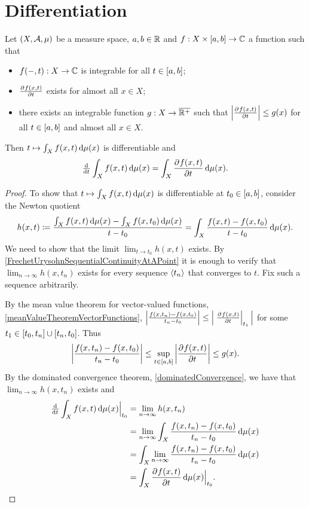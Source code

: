 \section{Differentiation}
\begin{proposition} \label{differentiationUnderIntegral}
Let $\sSet{X,\mathcal{A},\mu}$ be a measure space, $a,b\in \mathbb{R}$ and $f: X\times \interval{a,b}\to \C$ a function such that
\begin{itemize}
\item $f(-,t): X\to \mathbb{C}$ is integrable for all $t\in \interval{a,b}$;
\item $ \frac{\partial{^{}}f(x,t)}{\partial{{t}^{}}} $ exists for almost all $x\in X$;
\item there exists an integrable function $g: X\to \overline{\mathbb{R}^+}$ such that $\left| \frac{\partial{^{}}f(x,t)}{\partial{{t}^{}}} \right| \leq g(x)$ for all $t\in \interval{a,b}$ and almost all $x\in X$.
\end{itemize}
Then $t\mapsto \int_X f(x,t)\operatorname{d \!}{\mu}(x)$ is differentiable and
\[ \od{}{t}\int_X f(x,t)\diff{\mu}(x) = \int_X \pd{f(x,t)}{t}\diff{\mu}(x). \]
\end{proposition}
\begin{proof}
To show that $t\mapsto \int_X f(x,t)\operatorname{d \!}{\mu}(x)$ is differentiable at $t_0\in \interval{a,b}$, consider the Newton quotient
\[ h(x,t) \coloneqq \frac{\int_X f(x,t)\operatorname{d \!}{\mu}(x) - \int_X f(x,t_0)\operatorname{d \!}{\mu}(x)}{t-t_0} = \int_X \frac{f(x,t) - f(x,t_0)}{t-t_0}\operatorname{d \!}{\mu}(x). \]
We need to show that the limit $\lim_{t\to t_0} h(x,t)$ exists. By \ref{FrechetUrysohnSequentialContinuityAtAPoint} it is enough to verify that $\lim_{n\to \infty} h(x,t_n)$ exists for every sequence $\left\langle t_n \right\rangle$ that converges to $t$. Fix such a sequence arbitrarily.

By the mean value theorem for vector-valued functions, \ref{meanValueTheoremVectorFunctions}, $\left|\frac{f(x,t_n) - f(x,t_0)}{t_n-t_0}\right| \leq \Big|\left. \frac{\partial{^{}}f(x,t)}{\partial{{t}^{}}} \right|_{t_1}\Big|$ for some $t_1\in \interval{t_0,t_n}\cup \interval{t_n,t_0}$. Thus
\[ \left|\frac{f(x,t_n)-f(x,t_0)}{t_n-t_0}\right| \leq \sup_{t\in \interval{a,b}}\left|\pd{f(x,t)}{t}\right| \leq g(x). \]
By the dominated convergence theorem, \ref{dominatedConvergence}, we have that $\lim_{n\to \infty} h(x,t_n)$ exists and
\begin{align*}
\od{}{t}\int_X f(x,t)\diff{\mu}(x)\Big|_{t_0} &= \lim_{n\to \infty} h(x,t_n) \\
&= \lim_{n\to \infty}\int_X \frac{f(x,t_n) - f(x,t_0)}{t_n-t_0}\diff{\mu}(x) \\
&= \int_X \lim_{n\to \infty}\frac{f(x,t_n) - f(x,t_0)}{t_n-t_0}\diff{\mu}(x) \\
&= \int_X \pd{f(x,t)}{t}\diff{\mu}(x)\Big|_{t_0}.
\end{align*}
\end{proof}


